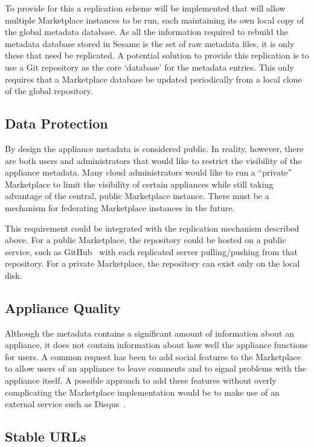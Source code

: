 To provide for this a replication scheme will be implemented that will 
allow multiple Marketplace instances to be run, each maintaining its own 
local copy of the global metadata database. As all the information required 
to rebuild the metadata database stored in Sesame is the set of raw metadata 
files, it is only these that need be replicated.  A potential solution to provide this
replication is to use a Git repository as the core `database' for the
metadata entries. This only requires that a Marketplace database be
updated periodically from a local clone of the global repository.

\subsection{Data Protection}

By design the appliance metadata is considered public.  In reality,
however, there are both users and administrators that would like to
restrict the visibility of the appliance metadata.  Many cloud
administrators would like to run a ``private'' Marketplace to limit
the visibility of certain appliances while still taking advantage of
the central, public Marketplace instance.  There must be a mechanism
for federating Marketplace instances in the future. 

This requirement could be integrated with the replication mechanism described above.  
For a public Marketplace, the repository could be hosted on a public service, 
such as GitHub~\cite{github} with each replicated server pulling/pushing 
from that repository.  For a private Marketplace, the repository can exist 
only on the local disk.

\subsection{Appliance Quality}

Although the metadata contains a significant amount of information
about an appliance, it does not contain information about how well the
appliance functions for users.  A common request has been to add
social features to the Marketplace to allow users of an appliance
to leave comments and to signal problems with the appliance itself.  
A possible approach to add these features without overly complicating 
the Marketplace implementation would be to make use of an external service 
such as Disqus~\cite{disqus}.

\subsection{Stable URLs}

